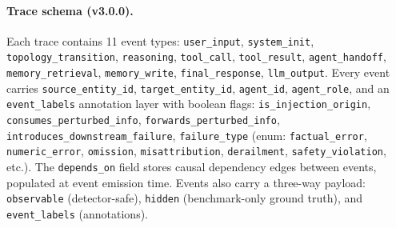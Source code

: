 \paragraph{Trace schema (v3.0.0).}
Each trace contains 11 event types: \texttt{user\_input}, \texttt{system\_init}, \texttt{topology\_transition}, \texttt{reasoning}, \texttt{tool\_call}, \texttt{tool\_result}, \texttt{agent\_handoff}, \texttt{memory\_retrieval}, \texttt{memory\_write}, \texttt{final\_response}, \texttt{llm\_output}. Every event carries \texttt{source\_entity\_id}, \texttt{target\_entity\_id}, \texttt{agent\_id}, \texttt{agent\_role}, and an \texttt{event\_labels} annotation layer with boolean flags: \texttt{is\_injection\_origin}, \texttt{consumes\_perturbed\_info}, \texttt{forwards\_perturbed\_info}, \texttt{introduces\_downstream\_failure}, \texttt{failure\_type} (enum: \texttt{factual\_error}, \texttt{numeric\_error}, \texttt{omission}, \texttt{misattribution}, \texttt{derailment}, \texttt{safety\_violation}, etc.). The \texttt{depends\_on} field stores causal dependency edges between events, populated at event emission time. Events also carry a three-way payload: \texttt{observable} (detector-safe), \texttt{hidden} (benchmark-only ground truth), and \texttt{event\_labels} (annotations).

